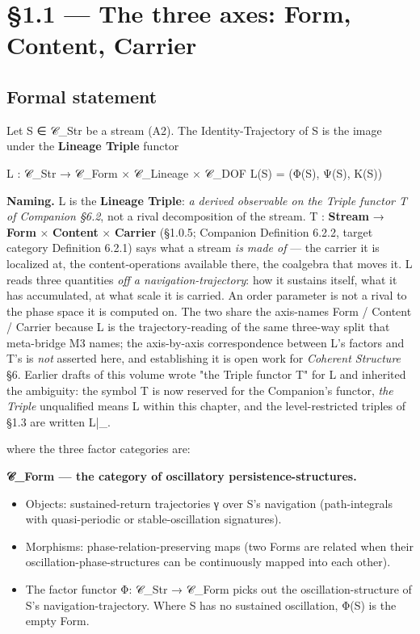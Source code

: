 \documentclass[11pt, openany]{book}
\newcommand{\sectionbreak}{\clearpage}
\begin{document}
\sectionbreak

\section{§1.1 --- The three axes: Form, Content, Carrier}

\subsection{Formal statement}

Let S ∈ 𝒞\_\allowbreak{}Str be a stream (A2). The Identity-Trajectory of S is the image under the \textbf{Lineage Triple} functor

\begin{Code}
L : 𝒞_Str → 𝒞_Form × 𝒞_Lineage × 𝒞_DOF
L(S) = (Φ(S), Ψ(S), Κ(S))
\end{Code}

\textbf{Naming.} L is the \textbf{Lineage Triple}: \textit{a derived observable on the Triple functor T of Companion §6.2}, not a rival decomposition of the stream. T : \textbf{Stream} → \textbf{Form} × \textbf{Content} × \textbf{Carrier} (§1.0.5; Companion Definition 6.2.2, target category Definition 6.2.1) says what a stream \textit{is made of} --- the carrier it is localized at, the content-operations available there, the coalgebra that moves it. L reads three quantities \textit{off a navigation-trajectory}: how it sustains itself, what it has accumulated, at what scale it is carried. An order parameter is not a rival to the phase space it is computed on. The two share the axis-names Form / Content / Carrier because L is the trajectory-reading of the same three-way split that meta-bridge M3 names; the axis-by-axis correspondence between L's factors and T's is \textit{not} asserted here, and establishing it is open work for \textit{Coherent Structure} §6. Earlier drafts of this volume wrote "the Triple functor T" for L and inherited the ambiguity: the symbol T is now reserved for the Companion's functor, \textit{the Triple} unqualified means L within this chapter, and the level-restricted triples of §1.3 are written L|\_.

where the three factor categories are:

\textbf{𝒞\_\allowbreak{}Form --- the category of oscillatory persistence-structures.}
\begin{itemize}
\item Objects: sustained-return trajectories γ over S's navigation (path-integrals with quasi-periodic or stable-oscillation signatures).
\item Morphisms: phase-relation-preserving maps (two Forms are related when their oscillation-phase-structures can be continuously mapped into each other).
\item The factor functor Φ: 𝒞\_\allowbreak{}Str → 𝒞\_\allowbreak{}Form picks out the oscillation-structure of S's navigation-trajectory. Where S has no sustained oscillation, Φ(S) is the empty Form.
\end{itemize}
\end{document}
